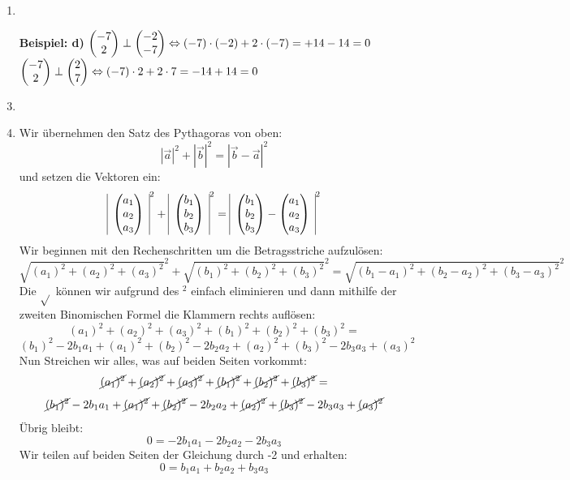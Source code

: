 	\begin{enumerate}
		\item
		\item[\textbf{Beispiel: d)}] 
		$ \begin{pmatrix} -7 \\ 2 \end{pmatrix}	\perp	\begin{pmatrix} -2 \\ -7 \end{pmatrix}	\Leftrightarrow	(-7)\cdot(-2)+2\cdot(-7)	=+14-14	= 0 $ \\
		$ \begin{pmatrix} -7 \\ 2 \end{pmatrix}	\perp	\begin{pmatrix} 2 \\ 7 \end{pmatrix}	\Leftrightarrow	(-7)\cdot2 + 2\cdot7		=-14+14	= 0 $
		
		\item
		

		\item
	Wir übernehmen den Satz des Pythagoras von oben: 
		$$|\vec{a}|^2 + |\vec{b}|^2 = |\vec{b} - \vec{a}|^2 $$
	und setzen die Vektoren ein:
		$$ \begin{array}{|c|}	\begin{pmatrix} a_{1} \\ a_{2} \\ a_{3} \end{pmatrix} \end{array} ^2 + \begin{array}{|c|}\begin{pmatrix} b_{1} \\ b_{2} \\ b_{3} \end{pmatrix} \end{array} ^2 = \begin{array}{|c|} \begin{pmatrix} b_{1} \\ b_{2} \\ b_{3} \end{pmatrix} -	\begin{pmatrix} a_{1} \\ a_{2} \\ a_{3} \end{pmatrix}\end{array} ^2  $$
	Wir beginnen mit den Rechenschritten um die Betragsstriche aufzulösen:
		$$ \sqrt{(a_1)^{2} + (a_{2})^2 + (a_{3})^2} ^2 + \sqrt{(b_1)^{2} + (b_{2})^2 + (b_{3})^2} ^2 = \sqrt{(b_1-a_1)^2 + (b_2-a_2)^2 + (b_3-a_3)^2}^2 $$
		Die $\sqrt{}$ können wir aufgrund des $^2$ einfach eliminieren und dann mithilfe der zweiten Binomischen Formel die Klammern rechts auflösen:
		$$ (a_1)^{2} + (a_2)^2 + (a_3)^2 + (b_1)^{2} + (b_2)^2 + (b_3)^2 = $$
		$$ (b_1)^2 - 2b_{1}a_{1} + (a_1)^2 + (b_2)^2 - 2b_{2}a_{2} + (a_2)^2 + (b_3)^2 - 2b_{3}a_{3} + (a_3)^2	$$
	Nun Streichen wir alles, was auf beiden Seiten vorkommt:
		$$ \cancel{(a_1)^{2}} + \cancel{(a_2)^2} + \cancel{(a_3)^2} + \cancel{(b_1)^2} + \cancel{(b_2)^2} + \cancel{(b_3)^2} =$$
		$$ \cancel{(b_1)^2} - 2b_{1}a_{1} + \cancel{(a_1)^2} + \cancel{(b_2)^2} - 2b_{2}a_{2} + \cancel{(a_2)^2} + \cancel{(b_3)^2} - 2b_{3}a_{3} + \cancel{(a_3)^2} $$
	Übrig bleibt:
		$$ 0 = 	- 2b_{1}a_{1} - 2b_{2}a_{2} - 2b_{3}a_{3} $$
	Wir teilen auf beiden Seiten der Gleichung durch -2 und erhalten: 
		$$ 0 = b_{1}a_{1} + b_{2}a_{2} + b_{3}a_{3} $$


\end{enumerate}
